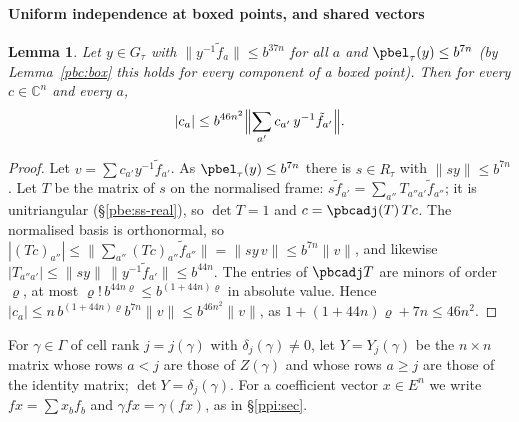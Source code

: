 \documentclass[10pt]{amsart}
\newtheorem{lemma}[theorem]{Lemma}
\theoremstyle{definition}
\theoremstyle{remark}
\newcommand{\C}{\mathbb C}
\begin{document}
\paragraph*{Uniform independence at boxed points, and shared vectors}

\begin{lemma}\label{pbc:indep}
Let $y\in G_\tau$ with $\|y^{-1}\tilde f_a\|\le b^{37n}$ for all $a$ and $\pbel_\tau(y)\le b^{7n}$ (by
Lemma~\ref{pbc:box} this holds for every component of a boxed point). Then for every $c\in\C^n$ and every $a$,
\[
|c_a|\le b^{46n^2}\Bigl\|\sum_{a'}c_{a'}\,y^{-1}\tilde f_{a'}\Bigr\| .
\]
\end{lemma}
\begin{proof}
Let $v=\sum c_{a'}y^{-1}\tilde f_{a'}$. As $\pbel_\tau(y)\le b^{7n}$ there is $s\in R_\tau$ with $\|sy\|\le
b^{7n}$. Let $T$ be the matrix of $s$ on the normalised frame: $s\tilde f_{a'}=\sum_{a''}T_{a''a'}
\tilde f_{a''}$; it is unitriangular (\S\ref{pbe:ss-real}), so $\det T=1$ and $c=\pbcadj(T)\,Tc$. The
normalised basis is orthonormal, so $|(Tc)_{a''}|\le\|\sum_{a''}(Tc)_{a''}\tilde f_{a''}\|=\|sy\,v\|\le
b^{7n}\|v\|$, and likewise $|T_{a''a'}|\le\|sy\|\,\|y^{-1}\tilde f_{a'}\|\le b^{44n}$. The entries of
$\pbcadj T$ are minors of order $\varrho$, at most $\varrho!\,b^{44n\varrho}\le b^{(1+44n)\varrho}$ in
absolute value. Hence $|c_a|\le n\,b^{(1+44n)\varrho}b^{7n}\|v\|\le b^{46n^2}\|v\|$, as $1+(1+44n)
\varrho+7n\le46n^2$.
\end{proof}

For $\gamma\in\Gamma$ of cell rank $j=j(\gamma)$ with $\delta_j(\gamma)\ne0$, let $Y=Y_j(\gamma)$ be the
$n\times n$ matrix whose rows $a<j$ are those of $Z(\gamma)$ and whose rows $a\ge j$ are those of the
identity matrix; $\det Y=\delta_j(\gamma)$. For a coefficient vector $x\in E^n$ we write $fx=\sum x_b f_b$
and $\gamma fx=\gamma(fx)$, as in \S\ref{ppi:sec}.
\end{document}
